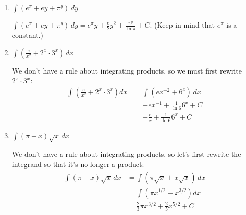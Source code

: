\documentclass[main]{subfiles}
\begin{document}
\begin{enumerate}[resume,topsep=0pt]
\begin{enumerate}
  \item
    \begin{problem}[\vfill]
      $\displaystyle \int (e^\pi + ey + \pi^y)\,dy$
    \end{problem}

    \begin{solution}
      $\displaystyle \int (e^\pi + ey + \pi^y)\,dy = \boxed{e^\pi y +
        \frac{e}{2} y^2 + \frac{\pi^y}{\ln \pi} + C}$.  (Keep in mind
      that $e^\pi$ is a constant.)
    \end{solution}

  \item
    \begin{problem}[\stretch{1.5}]
      $\displaystyle \int \left( \frac{e}{x^2} + 2^x \cdot 3^x
      \right)\,dx$
    \end{problem}

    \begin{solution}
      We don't have a rule about integrating products, so we must first
      rewrite $2^x \cdot 3^x$:
      \begin{align*}
        \int \left( \frac{e}{x^2} + 2^x \cdot 3^x \right) dx &= \int
        \left( e x^{-2} + 6^x \right)\,dx \\
        &= - e x^{-1} + \frac{1}{\ln 6} 6^x + C\\
        &= \boxed{- \frac{e}{x} + \frac{1}{\ln 6} 6^x + C}
      \end{align*}
    \end{solution}

  \item


    \begin{problem}[\stretch{1.5}]
      $\displaystyle \int (\pi+x)\sqrt{x}\, dx$
    \end{problem}

    \begin{solution}
      We don't have a rule about integrating products, so let's first
      rewrite the integrand so that it's no longer a product: 
      \begin{align*}
        \int (\pi + x) \sqrt{x}\,dx &= \int (\pi \sqrt{x} + x
        \sqrt{x})\, dx \\
        &= \int \left( \pi x^{1/2} + x^{3/2} \right) dx \\
        &= \boxed{ \frac{2}{3} \pi x^{3/2} + \frac{2}{5} x^{5/2} + C} 
      \end{align*}
    \end{solution}


\end{enumerate}
\end{enumerate}
\end{document}
